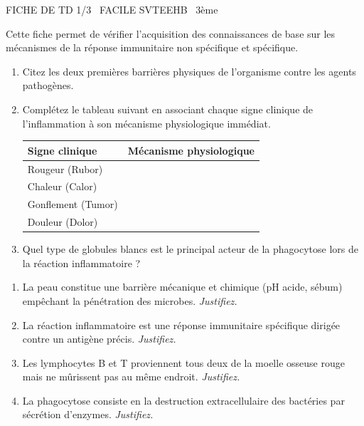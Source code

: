 \documentclass[11pt]{article}
\begin{document}
\begin{tcolorbox}[enhanced,colback=popink,colframe=popink,arc=10pt,boxrule=0pt,left=12pt,right=12pt,top=9pt,bottom=9pt]
{\color{white}\popxbold\small FICHE DE TD 1/3 \textbullet\ FACILE \hfill SVTEEHB \textbullet\ 3ème\par}
\end{tcolorbox}
\vspace{4pt}
Cette fiche permet de vérifier l'acquisition des connaissances de base sur les mécanismes de la réponse immunitaire non spécifique et spécifique.

\begin{exercice}
\begin{enumerate}
    \item Citez les deux premières barrières physiques de l'organisme contre les agents pathogènes.
    \item Complétez le tableau suivant en associant chaque signe clinique de l'inflammation à son mécanisme physiologique immédiat.
    \begin{tabular}{|l|l|}
    \hline
    \textbf{Signe clinique} & \textbf{Mécanisme physiologique} \\
    \hline
    Rougeur (Rubor) & \\
    \hline
    Chaleur (Calor) & \\
    \hline
    Gonflement (Tumor) & \\
    \hline
    Douleur (Dolor) & \\
    \hline
    \end{tabular}
    \item Quel type de globules blancs est le principal acteur de la phagocytose lors de la réaction inflammatoire ?
\end{enumerate}
\end{exercice}

\begin{exercice}
\begin{enumerate}
    \item La peau constitue une barrière mécanique et chimique (pH acide, sébum) empêchant la pénétration des microbes. \textit{Justifiez.}
    \item La réaction inflammatoire est une réponse immunitaire spécifique dirigée contre un antigène précis. \textit{Justifiez.}
    \item Les lymphocytes B et T proviennent tous deux de la moelle osseuse rouge mais ne mûrissent pas au même endroit. \textit{Justifiez.}
    \item La phagocytose consiste en la destruction extracellulaire des bactéries par sécrétion d'enzymes. \textit{Justifiez.}
\end{enumerate}
\end{exercice}
\end{document}
